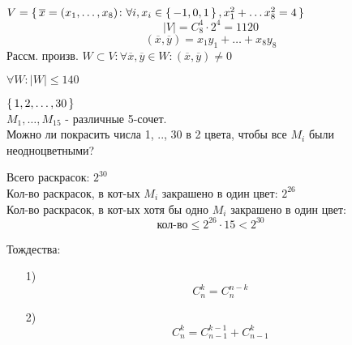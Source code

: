 $V = \set{\overline{x} = (x_1, \ldots, x_8)\colon \forall i, x_i \in \set{-1, 0, 1}, x_1^{2} + \ldots x_8^{2} = 4}$
\[
\left|V\right| = C_{8}^{4} \cdot 2^{4} = 1120
\]
\[
  (\overline{x}, \overline{y}) = x_1y_1 + \ldots + x_8y_8
\]
Рассм. произв. $W \subset V \colon \forall \overline{x}, \overline{y} \in W \colon (\overline{x}, \overline{y}) \neq 0$
\begin{statement}
$\forall W \colon \left|W\right| \leq 140$
\end{statement}
\begin{task}
$\set{1, 2, \ldots, 30}$ \\
$M_1, \ldots, M_{15}$ - различные 5-сочет. \\
Можно ли покрасить числа 1, .., 30 в 2 цвета, чтобы все $M_i$ были неодноцветными?
\end{task}
\begin{solution}
Всего раскрасок: $2^{30}$ \\
Кол-во раскрасок, в кот-ых $M_i$ закрашено в один цвет: $2^{26}$ \\
Кол-во раскрасок, в кот-ых хотя бы одно $M_i$ закрашено в один цвет:
\[
  \text{кол-во} \leq 2^{26} \cdot 15 < 2^{30}
\]
\end{solution}
Тождества:
\begin{itemize}
  \item [1) ] \[
  C_{n}^{k} = C_{n}^{n - k}
  \]
\item [2) ] \[
  C_{n}^{k} = C_{n - 1}^{k - 1} + C_{n - 1}^{k}
\]
\end{itemize}
